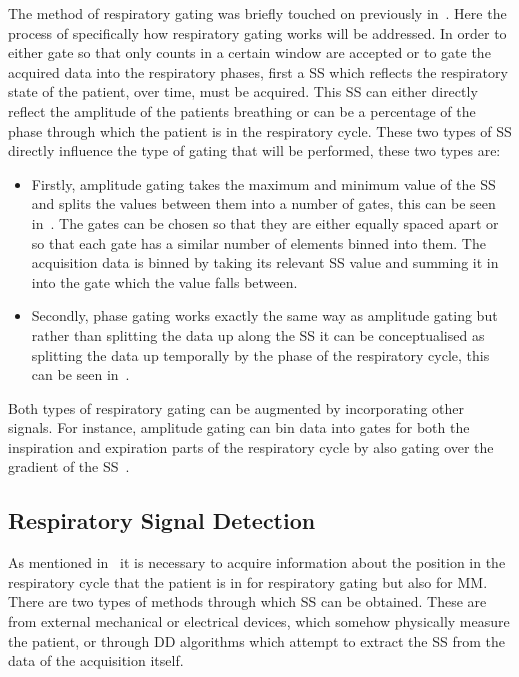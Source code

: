             The method of respiratory gating was briefly touched on previously in~. Here the process of specifically how respiratory gating works will be addressed. In order to either gate so that only counts in a certain window are accepted or to gate the acquired data into the respiratory phases, first a \gls{SS} which reflects the respiratory state of the patient, over time, must be acquired. This \gls{SS} can either directly reflect the amplitude of the patients breathing or can be a percentage of the phase through which the patient is in the respiratory cycle. These two types of \gls{SS} directly influence the type of gating that will be performed, these two types are:
            
            \begin{itemize}
                \item Firstly, amplitude gating takes the maximum and minimum value of the \gls{SS} and splits the values between them into a number of gates, this can be seen in~. The gates can be chosen so that they are either equally spaced apart or so that each gate has a similar number of elements binned into them. The acquisition data is binned by taking its relevant \gls{SS} value and summing it in into the gate which the value falls between.
                
                \item Secondly, phase gating works exactly the same way as amplitude gating but rather than splitting the data up along the \gls{SS} it can be conceptualised as splitting the data up temporally by the phase of the respiratory cycle, this can be seen in~.
            \end{itemize}
            
            Both types of respiratory gating can be augmented by incorporating other signals. For instance, amplitude gating can bin data into gates for both the inspiration and expiration parts of the respiratory cycle by also gating over the gradient of the \gls{SS}~.
        
        \subsection{Respiratory Signal Detection} \label{sec:respiratory_signal_detection}
            As mentioned in~ it is necessary to acquire information about the position in the respiratory cycle that the patient is in for respiratory gating but also for \gls{MM}. There are two types of methods through which \gls{SS} can be obtained. These are from external mechanical or electrical devices, which somehow physically measure the patient, or through \gls{DD} algorithms which attempt to extract the \gls{SS} from the data of the acquisition itself.
            
